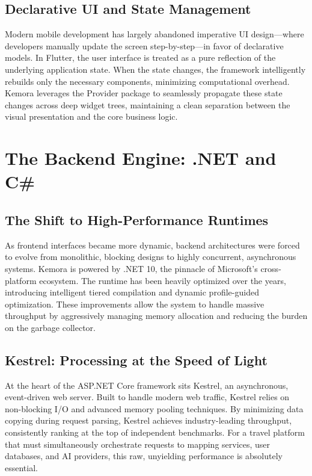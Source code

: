 \subsection{Declarative UI and State Management}
Modern mobile development has largely abandoned imperative UI design—where developers manually update the screen step-by-step—in favor of declarative models. In Flutter, the user interface is treated as a pure reflection of the underlying application state. When the state changes, the framework intelligently rebuilds only the necessary components, minimizing computational overhead. Kemora leverages the Provider package to seamlessly propagate these state changes across deep widget trees, maintaining a clean separation between the visual presentation and the core business logic.

\section{The Backend Engine: .NET and C\#}
\subsection{The Shift to High-Performance Runtimes}
As frontend interfaces became more dynamic, backend architectures were forced to evolve from monolithic, blocking designs to highly concurrent, asynchronous systems. Kemora is powered by .NET 10, the pinnacle of Microsoft's cross-platform ecosystem. The runtime has been heavily optimized over the years, introducing intelligent tiered compilation and dynamic profile-guided optimization. These improvements allow the system to handle massive throughput by aggressively managing memory allocation and reducing the burden on the garbage collector.

\subsection{Kestrel: Processing at the Speed of Light}
At the heart of the ASP.NET Core framework sits Kestrel, an asynchronous, event-driven web server. Built to handle modern web traffic, Kestrel relies on non-blocking I/O and advanced memory pooling techniques. By minimizing data copying during request parsing, Kestrel achieves industry-leading throughput, consistently ranking at the top of independent benchmarks. For a travel platform that must simultaneously orchestrate requests to mapping services, user databases, and AI providers, this raw, unyielding performance is absolutely essential.

